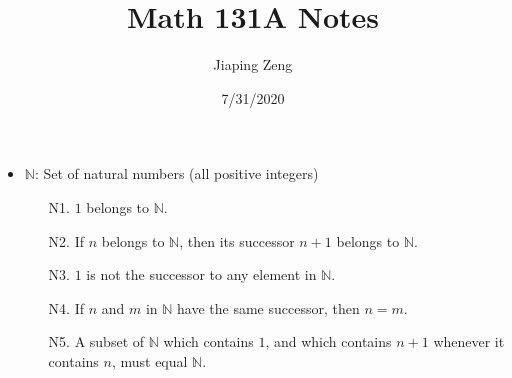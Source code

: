 \documentclass{article}
\title{Math 131A Notes}
\date{7/31/2020}
\author{Jiaping Zeng}
\begin{document}
\maketitle

\begin{itemize}
	\item $\mathbb{N}$: Set of natural numbers (all positive integers)
	      \begin{itemize}
		      \item [N1.] $1$ belongs to $\mathbb{N}$.
		      \item [N2.] If $n$ belongs to $\mathbb{N}$, then its successor $n+1$ belongs to $\mathbb{N}$.
		      \item [N3.] $1$ is not the successor to any element in $\mathbb{N}$.
		      \item [N4.] If $n$ and $m$ in $\mathbb{N}$ have the same successor, then $n=m$.
		      \item [N5.] A subset of $\mathbb{N}$ which contains $1$, and which contains $n+1$ whenever it contains $n$, must equal $\mathbb{N}$.
	      \end{itemize}
\end{itemize}
\end{document}
